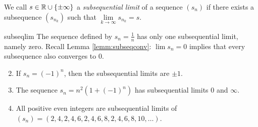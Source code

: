 \begin{defn}{}{}
	We call $s\in\mathbb{R}\cup\{\pm\infty\}$ a \emph{subsequential limit} of a sequence $(s_n)$ if there exists a subsequence $(s_{n_k})$ such that $\lim\limits_{k\to\infty}s_{n_k}=s$.
\end{defn}

\begin{examples}{}{subseqlim}
	\exstart The sequence defined by $s_n=\frac 1n$ has only one subsequential limit, namely zero. Recall Lemma \ref{lemm:subseqconv}: $\lim s_n=0$ implies that every subsequence also converges to 0.
\begin{enumerate}\setcounter{enumi}{1}
  \item If $s_n=(-1)^n$, then the subsequential limits are $\pm 1$. %
  \item The sequence $s_n=n^2(1+(-1)^n)$ has subsequential limits 0 and $\infty$.
  \item All positive even integers are subsequential limits of $(s_n)=(2,4,2,4,6,2,4,6,8,2,4,6,8,10,\ldots)$.



\end{enumerate}
\end{examples}
